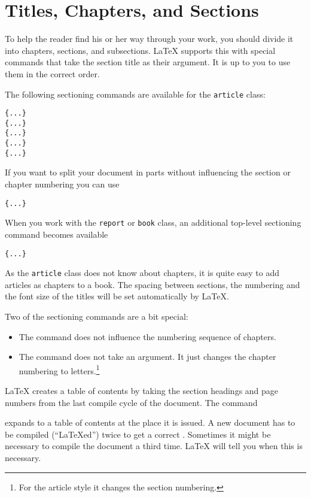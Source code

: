 \section{Titles, Chapters, and Sections}

To help the reader find his or her way through your work, you should
divide it into chapters, sections, and subsections.  \LaTeX{} supports
this with special commands that take the section title as their
argument.  It is up to you to use them in the correct order.

The following sectioning commands are available for the
\texttt{article} class: \nopagebreak

\begin{lscommand}
\verb|{...}|\\
\verb|{...}|\\
\verb|{...}|\\
\verb|{...}|\\
\verb|{...}|
\end{lscommand}

If you want to split your document in parts without influencing the
section or chapter numbering you can use
\begin{lscommand}
\verb|{...}|
\end{lscommand}

When you work with the \texttt{report} or \texttt{book} class,
an additional top-level sectioning command becomes available
\begin{lscommand}
\verb|{...}|
\end{lscommand}

As the \texttt{article} class does not know about chapters, it is quite easy
to add articles as chapters to a book.
The spacing between sections, the numbering and the font size of the
titles will be set automatically by \LaTeX. 

Two of the sectioning commands are a bit special: 
\begin{itemize}
\item The  command does
  not influence the numbering sequence of chapters.  
\item The  command does not take an argument. It just
  changes the chapter numbering to letters.\footnote{For the article
    style it changes the section numbering.}
\end{itemize}



\LaTeX{} creates a table of contents by taking the section headings
and page numbers from the last compile cycle of the document. The command 
\begin{lscommand} 
\end{lscommand} 
\noindent expands to a table of contents at the place it
is issued. A new
document has to be compiled (``\LaTeX ed'') twice to get a
correct . Sometimes it might be
necessary to compile the document a third time. \LaTeX{} will tell you
when this is necessary.

